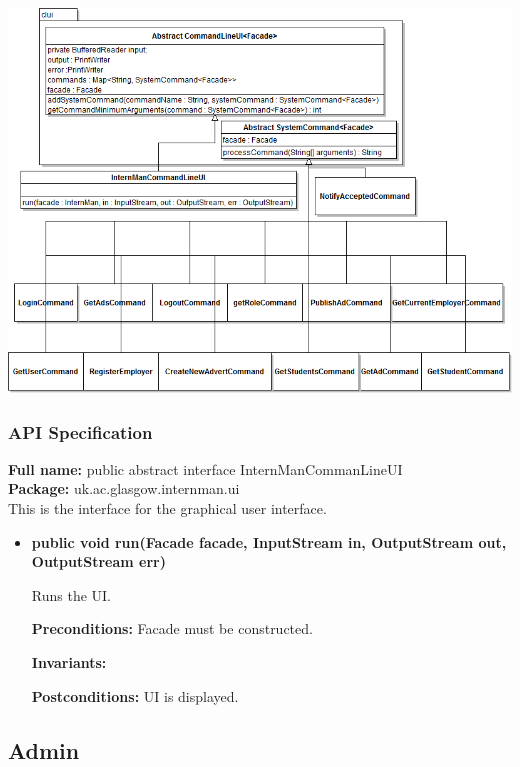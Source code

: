 \documentclass[11pt]{l3deliverable}
\begin{document}
\includegraphics[scale=0.65,angle=90]{UIClassDiagram.png}

\subsubsection{API Specification}

\textbf{Full name:} public abstract interface InternManCommanLineUI\\

\textbf{Package:} uk.ac.glasgow.internman.ui\\

This is the interface for the graphical user interface.

\begin{itemize}

\item{\textbf{public void run(Facade facade, InputStream in, OutputStream out,
			OutputStream err)}

Runs the UI.

\textbf{Preconditions:} Facade must be constructed.

\textbf{Invariants:}

\textbf{Postconditions:} UI is displayed.}

\end{itemize}

\newpage

\subsection{Admin}
\end{document}
